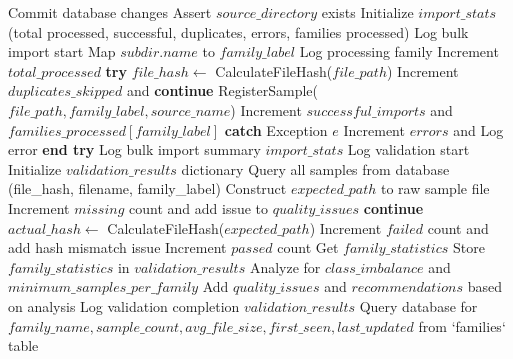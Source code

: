\begin{algorithm}[!htbp]
\begin{algorithmic}[1]
    \State Commit database changes
\EndProcedure
\Statex
{}
    \State Assert $source\_directory$ exists
    \State Initialize $import\_stats$ (total processed, successful, duplicates, errors, families processed)
    \State Log bulk import start
            \State Map $subdir.name$ to $family\_label$
            \State Log processing family
                    \State Increment $total\_processed$
                    \State \textbf{try}
                        \State $file\_hash \leftarrow$ CalculateFileHash($file\_path$)
                            \State Increment $duplicates\_skipped$ and \textbf{continue}
                        \EndIf
                        \State RegisterSample($file\_path, family\_label, source\_name$)
                        \State Increment $successful\_imports$ and $families\_processed[family\_label]$
                    \State \textbf{catch} {Exception $e$}
                        \State Increment $errors$ and Log error
                    \State \textbf{end try}
                \EndIf
            \EndFor
        \EndIf
    \EndFor
    \State Log bulk import summary
    \Return $import\_stats$
\EndProcedure
\Statex
{}
    \State Log validation start
    \State Initialize $validation\_results$ dictionary
    \State Query all samples from database (file\_hash, filename, family\_label)
        \State Construct $expected\_path$ to raw sample file
            \State Increment $missing$ count and add issue to $quality\_issues$
            \State \textbf{continue}
        \EndIf
        \State $actual\_hash \leftarrow$ CalculateFileHash($expected\_path$)
            \State Increment $failed$ count and add hash mismatch issue
        \Else
            \State Increment $passed$ count
        \EndIf
    \EndFor
    \State Get $family\_statistics$
    \State Store $family\_statistics$ in $validation\_results$
    \State Analyze for $class\_imbalance$ and $minimum\_samples\_per\_family$
    \State Add $quality\_issues$ and $recommendations$ based on analysis
    \State Log validation completion
    \Return $validation\_results$
\EndProcedure
\Statex
{}
    \State Query database for $family\_name, sample\_count, avg\_file\_size, first\_seen, last\_updated$ from `families` table

\end{algorithmic}
\end{algorithm}
